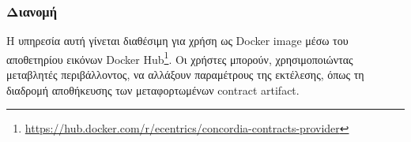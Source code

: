 \subsubsection{Διανομή}

Η υπηρεσία αυτή γίνεται διαθέσιμη για χρήση ως Docker image μέσω του αποθετηρίου εικόνων Docker Hub\footnote{\url{https://hub.docker.com/r/ecentrics/concordia-contracts-provider}}. Οι χρήστες μπορούν, χρησιμοποιώντας μεταβλητές περιβάλλοντος, να αλλάξουν παραμέτρους της εκτέλεσης, όπως τη διαδρομή αποθήκευσης των μεταφορτωμένων \textenglish{contract artifact}.